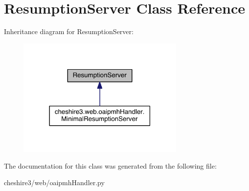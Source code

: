 \hypertarget{class_resumption_server}{\section{Resumption\-Server Class Reference}
\label{class_resumption_server}
}


Inheritance diagram for Resumption\-Server\-:
\nopagebreak
\begin{figure}[H]
\begin{center}
\leavevmode
\includegraphics[width=234pt]{class_resumption_server__inherit__graph}
\end{center}
\end{figure}


The documentation for this class was generated from the following file\-:\begin{DoxyCompactItemize}
\item 
cheshire3/web/oaipmh\-Handler.\-py\end{DoxyCompactItemize}
